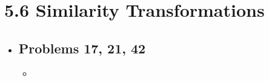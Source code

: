 \section{5.6 Similarity Transformations}
\begin{itemize}
  \item []

  \subsection{Problems 17, 21, 42}
  \begin{itemize}
    \item
  \end{itemize}

\end{itemize}

